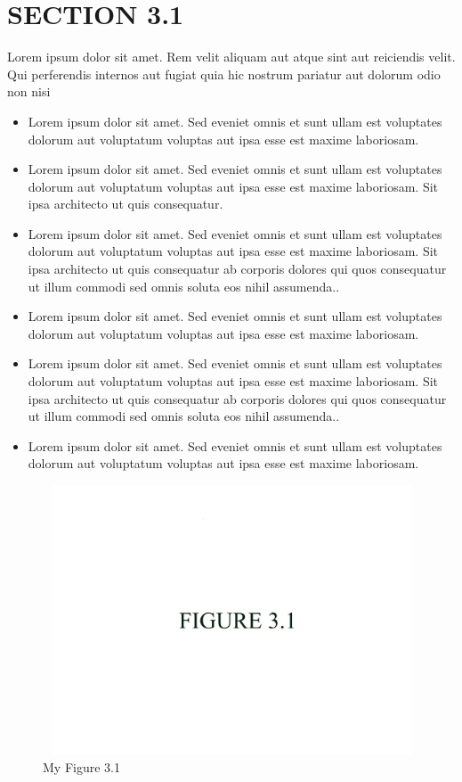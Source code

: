 \documentclass[a4paper,12pt]{report}
\begin{document}
\section{SECTION 3.1}

\hspace{.5cm} Lorem ipsum dolor sit amet. Rem velit aliquam aut atque sint aut reiciendis velit. Qui perferendis internos aut fugiat quia hic nostrum pariatur aut dolorum odio non nisi 
\newpage
\begin{itemize}
    \item Lorem ipsum dolor sit amet. Sed eveniet omnis et sunt ullam est voluptates dolorum aut voluptatum voluptas aut ipsa esse est maxime laboriosam.   
    \item Lorem ipsum dolor sit amet. Sed eveniet omnis et sunt ullam est voluptates dolorum aut voluptatum voluptas aut ipsa esse est maxime laboriosam. Sit ipsa architecto ut quis consequatur.
    \item Lorem ipsum dolor sit amet. Sed eveniet omnis et sunt ullam est voluptates dolorum aut voluptatum voluptas aut ipsa esse est maxime laboriosam. Sit ipsa architecto ut quis consequatur ab corporis dolores qui quos consequatur ut illum commodi sed omnis soluta eos nihil assumenda..
    \item Lorem ipsum dolor sit amet. Sed eveniet omnis et sunt ullam est voluptates dolorum aut voluptatum voluptas aut ipsa esse est maxime laboriosam.
    \item Lorem ipsum dolor sit amet. Sed eveniet omnis et sunt ullam est voluptates dolorum aut voluptatum voluptas aut ipsa esse est maxime laboriosam. Sit ipsa architecto ut quis consequatur ab corporis dolores qui quos consequatur ut illum commodi sed omnis soluta eos nihil assumenda..
 \item  Lorem ipsum dolor sit amet. Sed eveniet omnis et sunt ullam est voluptates dolorum aut voluptatum voluptas aut ipsa esse est maxime laboriosam.
\end{itemize}

\begin{figure}[h]
        \centering
        \includegraphics[width=17cm,height=8cm]{fig_3.1.jpg}
        \caption{My Figure 3.1}
        \label{fig:my_label}
\end{figure}
\end{document}

